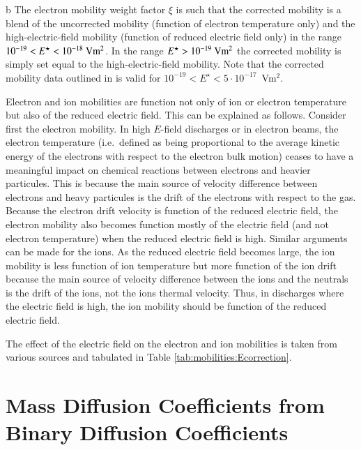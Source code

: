 \documentclass{warpdoc}
\begin{document}
\begin{table}[t]
\begin{threeparttable}
\begin{tablenotes}
      \item[b] The electron mobility weight factor $\xi$ is such that the corrected mobility is a blend of the uncorrected mobility (function of electron temperature only) and the high-electric-field mobility (function of reduced electric field only) in the range $10^{-19}<E^\star<10^{-18}~ {\rm Vm^2}$. In the range $E^\star>10^{-19}~ {\rm Vm^2}$ the corrected mobility is simply set equal to the high-electric-field mobility. Note that the corrected mobility data outlined in \cite{ps:2005:tarasenko} is valid for $10^{-19}<E^\star<5\cdot 10^{-17}$~Vm$^2$.
    \end{tablenotes}
   \end{threeparttable}
\end{table}
%

Electron and ion mobilities are function not only of ion or electron temperature but also of the reduced electric field. This can be explained as follows. Consider first the electron mobility. In high $E$-field discharges or in electron beams, the electron temperature (i.e.\ defined as being proportional to the average kinetic energy of the electrons with respect to the electron bulk motion) ceases to have a meaningful impact on chemical reactions between electrons and heavier particules. This is because the main source of velocity difference between electrons and heavy particules is the drift of the electrons with respect to the gas. Because the electron drift velocity is function of the reduced electric field, the electron mobility also becomes function mostly of the electric field (and not electron temperature) when the reduced electric field is high. Similar arguments can be made for the ions. As the reduced electric field becomes large, the ion mobility is less function of ion temperature but more function of the ion drift because the main source of velocity difference between the ions and the neutrals is the drift of the ions, not the ions thermal velocity. Thus, in discharges where the electric field is high, the ion mobility should be function of the reduced electric field.

The effect of the electric field on the electron and ion mobilities is taken from various sources and tabulated in Table \ref{tab:mobilities:Ecorrection}. 



\section{Mass Diffusion Coefficients from Binary Diffusion Coefficients}
\end{document}
